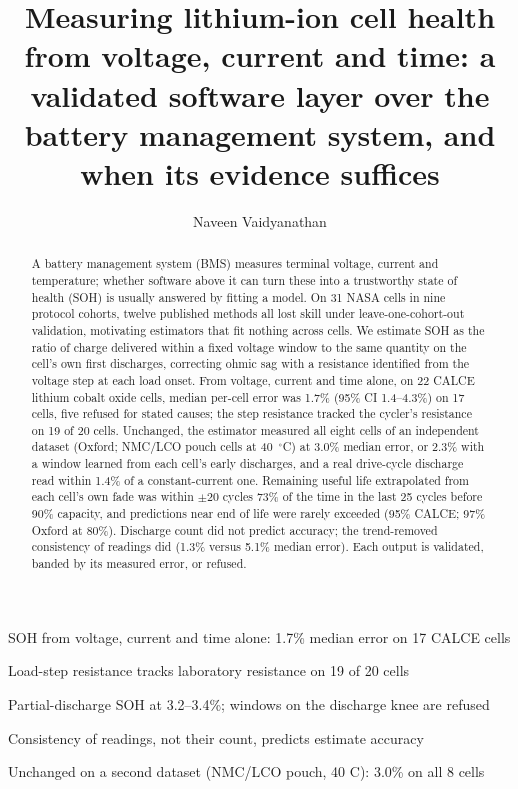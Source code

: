 \documentclass[preprint,12pt,authoryear]{elsarticle}
\begin{document}
\begin{frontmatter}

\title{Measuring lithium-ion cell health from voltage, current and time:
a validated software layer over the battery management system, and when its
evidence suffices}

\author[inst1]{Naveen Vaidyanathan}
\ead{[EMAIL]}

\begin{abstract}
A battery management system (BMS) measures terminal voltage, current and
temperature; whether software above it can turn these into a trustworthy
state of health (SOH) is usually answered by fitting a model. On 31
NASA cells in nine protocol cohorts, twelve published methods all lost skill
under leave-one-cohort-out validation, motivating estimators that fit nothing
across cells. We estimate SOH as the ratio of charge delivered within a fixed
voltage window to the same quantity on the cell's own first discharges,
correcting ohmic sag with a resistance identified from the voltage step at each
load onset. From voltage, current and time alone, on 22 CALCE lithium cobalt
oxide cells, median per-cell error was 1.7\% (95\% CI 1.4--4.3\%) on 17 cells,
five refused for stated causes; the step resistance tracked the cycler's
resistance on 19 of 20 cells. Unchanged, the estimator
measured all eight cells of an independent dataset (Oxford; NMC/LCO pouch cells
at 40~$^\circ$C) at 3.0\% median error, or 2.3\% with a window learned from
each cell's early discharges, and a real drive-cycle discharge read within
1.4\% of a constant-current one. Remaining useful life
extrapolated from each cell's own fade was within $\pm$20 cycles 73\% of the
time in the last 25 cycles before 90\% capacity, and predictions near end of
life were rarely exceeded (95\% CALCE; 97\% Oxford at 80\%). Discharge count did
not predict accuracy; the trend-removed consistency of readings did (1.3\% versus 5.1\% median error). Each output is
validated, banded by its measured error, or refused.
\end{abstract}

\begin{highlights}
\item SOH from voltage, current and time alone: 1.7\% median error on 17 CALCE cells
\item Load-step resistance tracks laboratory resistance on 19 of 20 cells
\item Partial-discharge SOH at 3.2--3.4\%; windows on the discharge knee are refused
\item Consistency of readings, not their count, predicts estimate accuracy
\item Unchanged on a second dataset (NMC/LCO pouch, 40 C): 3.0\% on all 8 cells
\end{highlights}


\end{frontmatter}
\end{document}
